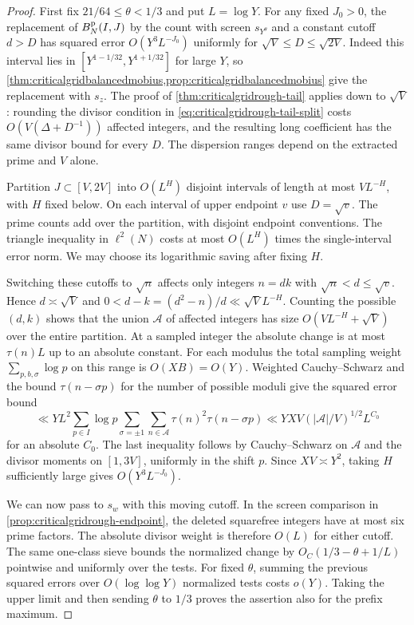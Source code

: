 \documentclass[11pt,a4paper]{article}
\numberwithin{equation}{section}
\begin{document}
\begin{proof}
First fix $21/64\le\theta<1/3$ and put $L=\log Y$. For any fixed
$J_0>0$, the replacement of $B_N^{\rm p}(I,J)$ by the count with
screen $s_{Y^\theta}$ and a constant cutoff $d>D$ has squared
error $O(Y^3L^{-J_0})$ uniformly for $\sqrt V\le D\le\sqrt{2V}$.
Indeed this interval lies in
$[Y^{1-1/32},Y^{1+1/32}]$ for large $Y$, so
\cref{thm:criticalgridbalancedmobius,prop:criticalgridbalancedmobius}
give the replacement with $s_z$. The proof of
\cref{thm:criticalgridrough-tail} applies down to $\sqrt V$:
rounding the divisor condition in
\cref{eq:criticalgridrough-tail-split} costs
$O(V(\Delta+D^{-1}))$ affected integers, and the resulting long
coefficient has the same divisor bound for every $D$. The
dispersion ranges depend on the extracted prime and $V$ alone.

Partition $J\subset[V,2V]$ into $O(L^H)$ disjoint intervals of
length at most $VL^{-H}$, with $H$ fixed below. On each interval
of upper endpoint $v$ use $D=\sqrt v$. The prime counts add over
the partition, with disjoint endpoint conventions. The triangle
inequality in $\ell^2(N)$ costs at most $O(L^H)$ times the
single-interval error norm. We may choose its logarithmic saving
after fixing $H$.

Switching these cutoffs to $\sqrt n$ affects only integers
$n=dk$ with $\sqrt n<d\le\sqrt v$. Hence $d\asymp\sqrt V$ and
$0<d-k=(d^2-n)/d\ll\sqrt V L^{-H}$. Counting the possible
$(d,k)$ shows that the union $\mathcal A$ of affected integers
has size $O(VL^{-H}+\sqrt V)$ over the entire partition.
At a sampled integer the absolute change is at most $\tau(n)L$
up to an absolute constant. For each modulus the total sampling
weight $\sum_{p,b,\sigma}\log p$ on this range is $O(XB)=O(Y)$.
Weighted Cauchy--Schwarz and the bound $\tau(n-\sigma p)$ for
the number of possible moduli give the squared error bound
\[
 \ll YL^2\sum_{p\in I}\log p\sum_{\sigma=\pm1}
       \sum_{n\in\mathcal A}\tau(n)^2\tau(n-\sigma p)
 \ll YXV (|\mathcal A|/V)^{1/2} L^{C_0}
\]
for an absolute $C_0$. The last inequality follows by
Cauchy--Schwarz on $\mathcal A$ and the divisor moments on
$[1,3V]$, uniformly in the shift $p$. Since $XV\asymp Y^2$,
taking $H$ sufficiently large gives $O(Y^3L^{-J_0})$.

We can now pass to $s_w$ with this moving cutoff. In the screen
comparison in \cref{prop:criticalgridrough-endpoint}, the deleted
squarefree integers have at most six prime factors. The absolute
divisor weight is therefore $O(L)$ for either cutoff. The same
one-class sieve bounds the normalized change by
$O_C(1/3-\theta+1/L)$ pointwise and uniformly over the tests.
For fixed $\theta$, summing the previous squared errors over
$O(\log\log Y)$ normalized tests costs $o(Y)$. Taking the upper
limit and then sending $\theta$ to $1/3$ proves the assertion
also for the prefix maximum.


\end{proof}
\end{document}

